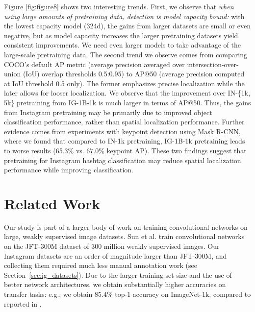 \documentclass[runningheads]{llncs}
\makeatletter
\newcommand{\etal}{et al.\@\xspace}
\newcommand{\eg}{e.g.\@\xspace}
\newcommand{\vs}{vs.\@\xspace}
\makeatother
\begin{document}
Figure \ref{fig:figure8} shows two interesting trends. First, we observe that \emph{when using large amounts of pretraining data, detection is model capacity bound:} with the lowest capacity model (324d), the gains from larger datasets are small or even negative, but as model capacity increases the larger pretraining datasets yield consistent improvements. We need even larger models to take advantage of the large-scale pretraining data. The second trend we observe comes from comparing COCO's default AP metric (average precision averaged over intersection-over-union (IoU) overlap thresholds 0.5:0.95) to AP@50 (average precision computed at IoU threshold 0.5 only). The former emphasizes precise localization while the later allows for looser localization. We observe that the improvement over IN-\{1k, 5k\} pretraining from IG-1B-1k is much larger in terms of AP@50. Thus, the gains from Instagram pretraining may be primarily due to improved object classification performance, rather than spatial localization performance. Further evidence comes from experiments with keypoint detection using Mask R-CNN, where we found that compared to IN-1k pretraining, IG-1B-1k pretraining leads to worse results (65.3\% \vs 67.0\% keypoint AP). These two findings suggest that pretraining for Instagram hashtag classification may reduce spatial localization performance while improving classification.
 \section{Related Work}
\label{sec:related_work}

Our study is part of a larger body of work on training convolutional networks on large, weakly supervised image datasets. Sun \etal \cite{sun2017unreasonable} train convolutional networks on the JFT-300M dataset of 300 million weakly supervised images. Our Instagram datasets are an order of magnitude larger than JFT-300M, and collecting them required much less manual annotation work (see Section~\ref{sec:ig_datasets}). Due to the larger training set size and the use of better network architectures, we obtain substantially higher accuracies on transfer tasks: \eg, we obtain 85.4\% top-1 accuracy on ImageNet-1k, compared to  reported in \cite{sun2017unreasonable}.
\end{document}
